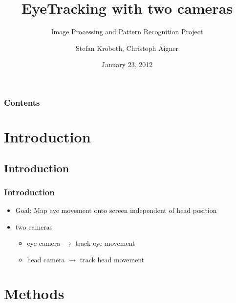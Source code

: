 \documentclass[%
14pt
]{beamer}
\title{EyeTracking with two cameras}
\subtitle{Image Processing and Pattern Recognition Project}
\author{Stefan Kroboth, Christoph Aigner}
\date{January 23, 2012}		%
\begin{document}

\begin{frame}[plain]
  \frametitle{}
  \titlepage %
\end{frame}



\begin{frame}
  \frametitle{Contents}
  \begin{spacing}{0.7}
        \tableofcontents[hideallsubsections %
                        ] %
                      \end{spacing}
\end{frame}

\section{Introduction}
\subsection{Introduction}
\begin{frame}
	\frametitle{Introduction}
  \begin{itemize}
    \item Goal: Map eye movement onto screen independent of head position
    \item two cameras
      \begin{itemize}
        \item eye camera $\rightarrow$ track eye movement
        \item head camera $\rightarrow$ track head movement
      \end{itemize}
  \end{itemize}
\end{frame}

\section{Methods}
\end{document}
